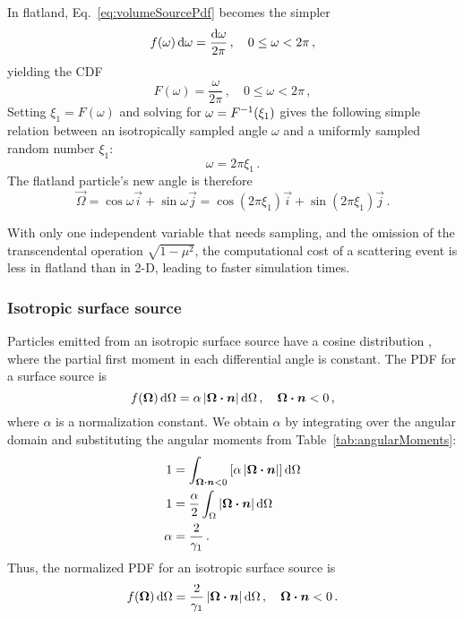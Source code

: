 In flatland, Eq.~\eqref{eq:volumeSourcePdf} becomes the simpler
\begin{equation*}
  f(\omega) \mathop{}\!\mathrm{d}\omega = \frac{\mathop{}\!\mathrm{d}\omega}{2\pi} \,,
  \quad 0 \le \omega < 2\pi\,,
\end{equation*}
yielding the CDF
\begin{equation}\label{eq:volumeSourceFlatland}
  F(\omega) = \frac{\omega}{2\pi}\,,
  \quad 0 \le \omega < 2\pi\,,
\end{equation}
Setting $\xi_1 = F(\omega)$ and solving for $\omega = F^{-1}(\xi_1)$ gives the
following simple relation between an isotropically sampled angle $\omega$ and a
uniformly sampled random number $\xi_1$:
\begin{equation*}
  \omega = 2\pi \xi_1\,.
\end{equation*}
The flatland particle's new angle is therefore
\begin{equation*}
  \vec{\Omega} = \cos \omega \vec{i} + \sin \omega \vec{j}
  = \cos(2\pi\xi_1) \vec{i} + \sin(2\pi\xi_1) \vec{j}\,.
\end{equation*}

With only one independent variable that needs sampling, and the omission of
the transcendental operation $\sqrt{1-\mu^2}$, the computational cost of a
scattering event is less in flatland than in 2-D, leading to
faster simulation times.

\subsubsection{Isotropic surface source}\label{sec:isoSurface}
Particles emitted from an isotropic surface source have a cosine distribution
\cite{Gre2002}, where the partial first moment in each differential angle is
constant. The PDF for a surface source is
\begin{equation*}
  f(\bm{\Omega}) \mathop{}\!\mathrm{d} \Omega = \alpha \left| \bm{\Omega}\bm{\cdot} \bm{n} \right| \mathop{}\!\mathrm{d} \Omega \,,
\quad \bm{\Omega}\bm{\cdot} \bm{n} < 0 \,,
\end{equation*}
where $\alpha$ is a normalization constant. We obtain $\alpha$ by integrating over
the angular domain and substituting the angular moments from Table~\ref{tab:angularMoments}:
\begin{align*}
  1 &= \int_{\bm{\Omega}\bm{\cdot} \bm{n} < 0} \left[ \alpha \left| \bm{\Omega}\bm{\cdot}
  \bm{n} \right| \right] \mathop{}\!\mathrm{d}\Omega
  \\
  1 &=\frac{\alpha}{2} \int_{\Omega} \left| \bm{\Omega}\bm{\cdot} \bm{n} \right| \mathop{}\!\mathrm{d}\Omega
  \\
  \alpha &= \frac{2}{\gamma_1}\,.
\end{align*}
Thus, the normalized PDF for an isotropic surface source is
\begin{equation}\label{eq:surfaceSourcePdf}
  f(\bm{\Omega}) \mathop{}\!\mathrm{d} \Omega = \frac{2}{\gamma_1} \left| \bm{\Omega}\bm{\cdot} \bm{n} \right| \mathop{}\!\mathrm{d} \Omega \,,
\quad \bm{\Omega}\bm{\cdot} \bm{n} < 0 \,.
\end{equation}

